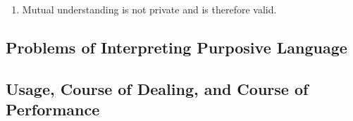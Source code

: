 \begin{enumerate}
    \item Mutual understanding is not private and is therefore valid.
\end{enumerate}

\subsection{Problems of Interpreting Purposive Language}


\subsection{Usage, Course of Dealing, and Course of Performance}


